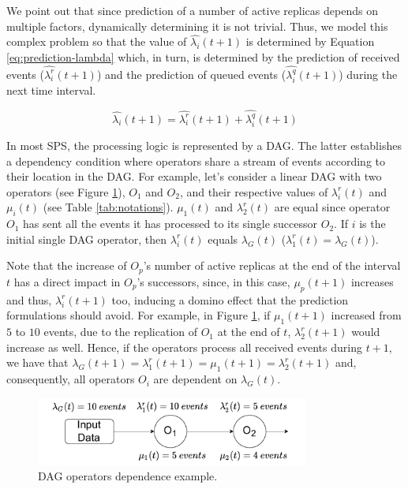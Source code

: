 We point out that since prediction of a number of active replicas depends on multiple factors, dynamically determining it is not trivial.
Thus, we model this complex problem so that the value of $\widehat{\lambda_i}(t+1)$ is determined by Equation \ref{eq:prediction-lambda} which, in turn, is determined by the prediction of received events ($\widehat{\lambda_i^r}(t+1)$) and the prediction of queued events ($\widehat{\lambda_i^q}(t+1)$) during the next time interval.

\begin{equation}
\label{eq:prediction-lambda}
    \widehat{\lambda_i}(t+1) = \widehat{\lambda_i^r}(t+1) + \widehat{\lambda_i^q}(t+1)
\end{equation}

In most SPS, the processing logic is represented by a DAG. The latter establishes a dependency condition where operators share a stream of events according to their location in the DAG. For example, let's consider a linear DAG with two operators (see Figure \ref{fig:sps-dependence}), $O_1$ and $O_2$, and their respective values of $\lambda^r_i(t)$ and $\mu_i(t)$ (see Table \ref{tab:notations}). $\mu_1(t)$ and $\lambda^r_2(t)$ are equal since operator $O_1$ has sent all the events it has processed to its single successor $O_2$. If $i$ is the initial single DAG operator, then $\lambda^r_i(t)$ equals $\lambda_G(t)$ ($\lambda^r_1(t) = \lambda_G(t)$).

Note that the increase of $O_p$'s number of active replicas at the end of the interval $t$ has a direct impact in $O_p$'s successors, since, in this case, $\mu_p(t+1)$ increases and thus,  $\lambda^r_i(t+1)$ too, inducing a domino effect that the prediction formulations should avoid. For example, in Figure \ref{fig:sps-dependence}, if $\mu_1(t+1)$ increased from $5$ to $10$ events, due to the replication of $O_1$ at the end of $t$, $\lambda^r_2(t+1)$ would increase as well. Hence, if the operators process all received events during $t+1$, we have that $\lambda_G(t+1)=\lambda^r_1(t+1)=\mu_1(t+1)=\lambda^r_2(t+1)$ and, consequently, all operators $O_i$ are dependent on $\lambda_G(t)$. 

\begin{figure}[!ht]
    \centering
    \includegraphics[width=0.8\textwidth]{figures/concepts/PA-SPS-Dependence.pdf}
    \caption{DAG operators dependence example.}
    \label{fig:sps-dependence}
\end{figure}



